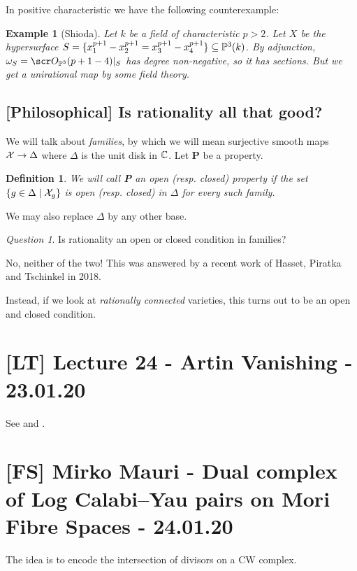 \documentclass[A4paper, british, reqno]{amsart}
\theoremstyle{darkgreentheorem}
\theoremstyle{darkbluedefinition}
\newtheorem{defn}[thm]{Definition}
\theoremstyle{darkredexample}
\newtheorem{exa}[thm]{Example}
\theoremstyle{remark}
\newtheorem{q}[thm]{Question}
\newcommand{\1}{\mathbbm{1}}
\newcommand{\sub}{\subseteq}
\begin{document}
In positive characteristic we have the following counterexample:
\begin{exa}[Shioda]
    Let $k$ be a field of characteristic $p>2$.
    Let $X$ be the hypersurface $S=\{ x_{1}^{p+1}-x_{2}^{p+1}= x_{3}^{p+1}-x_{4}^{p+1} \} \sub \P^{3}(k)$.
    By adjunction, $\w_{S}=\O_{\P^{3}}(p+1-4)|_{S}$ has degree non-negative, so it has sections.
    But we get a unirational map by some field theory.
\end{exa}

\subsection{[Philosophical] Is rationality all that good?}

We will talk about \textit{families}, by which we will mean surjective smooth maps $\mathcal{X}\to \Delta$ where $\Delta$ is the unit disk in $\mathbb{C}$.
Let \textbf{P} be a property.

\begin{defn}
    We will call \textbf{P} an \textit{open} (resp. \textit{closed}) property if the set $\{g\in \Delta \mid \mathcal{X}_{g}\}$ is open (resp. closed) in $\Delta$ for every such family.
\end{defn}

We may also replace $\Delta$ by any other base.

\begin{q}
    Is rationality an open or closed condition in families?
\end{q}

No, neither of the two!
This was answered by a recent work of Hasset, Piratka and Tschinkel in 2018.

Instead, if we look at \textit{rationally connected} varieties, this turns out to be an open and closed condition.

\section{[LT] Lecture 24 - Artin Vanishing - 23.01.20}

See \cite{voi07a} and \cite{voi07b}.

\section{[FS] Mirko Mauri - Dual complex of Log Calabi--Yau pairs on Mori Fibre Spaces - 24.01.20}

The idea is to encode the intersection of divisors on a CW complex.
\end{document}
